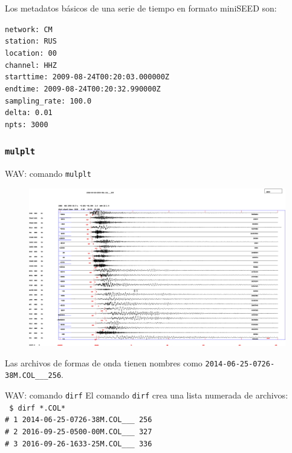 \documentclass[11pt]{beamer}
\begin{document}
\begin{frame}
Los metadatos básicos de una serie de tiempo en formato miniSEED son:
\begin{center}
{\tt       network: CM\\
         station: RUS\\
        location: 00\\
         channel: HHZ\\
       starttime: 2009-08-24T00:20:03.000000Z\\
         endtime: 2009-08-24T00:20:32.990000Z\\
   sampling\_rate: 100.0\\
              delta: 0.01\\
            npts: 3000\\}
\end{center}
\end{frame}


\subsubsection{{\tt mulplt}}
\begin{frame}{WAV: comando {\tt mulplt}}
\begin{figure}
\includegraphics[scale=0.15]{TRAZA.png}
\end{figure}
Las archivos de formas de onda tienen nombres como {\tt 2014-06-25-0726-38M.COL\_\_\_256}.
\end{frame}


\begin{frame}{WAV: comando {\tt dirf}}
El comando {\tt dirf} crea una lista numerada de archivos:\\
{\small \tt 
 \$ dirf *.COL*\\
 \#  1  2014-06-25-0726-38M.COL\_\_\_ 256 \\                                        
 \#  2  2016-09-25-0500-00M.COL\_\_\_ 327 \\                                        
 \#  3  2016-09-26-1633-25M.COL\_\_\_ 336 \\
}
\end{frame}
\end{document}
